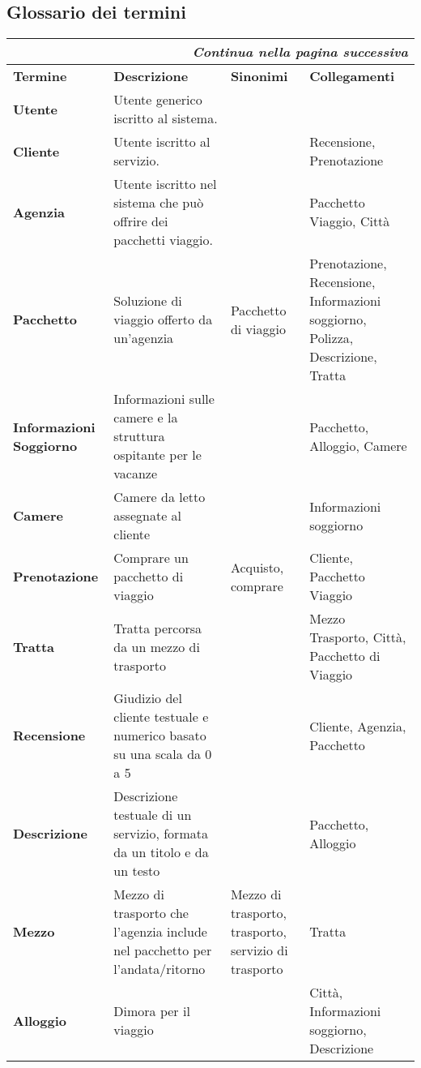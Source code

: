 \subsection{Glossario dei termini}
\begin{center}
    \begin{tabularx}{\textwidth}{p{} X >{\raggedright\arraybackslash}p{} >{\raggedright\arraybackslash}p{}}
        \caption{Dizionario termini}\\\toprule\endfirsthead
        \toprule\endhead
        \midrule\multicolumn{4}{r}{\itshape Continua nella pagina successiva}\\\midrule\endfoot
        \bottomrule\endlastfoot
        \textbf{Termine} & \textbf{Descrizione} & \textbf{Sinonimi} & \textbf{Collegamenti} \\
        \midrule
        \textbf{Utente} & Utente generico iscritto al sistema. & &
        \\\midrule
        \textbf{Cliente} & Utente iscritto al servizio. & & Recensione, Prenotazione
        \\\midrule
        \textbf{Agenzia} & Utente iscritto nel sistema che può offrire dei pacchetti viaggio. & & Pacchetto Viaggio, Città
        \\\midrule
        \textbf{Pacchetto} & Soluzione di viaggio offerto da un'agenzia & Pacchetto di viaggio & Prenotazione, Recensione, Informazioni soggiorno, Polizza, Descrizione, Tratta
        \\\midrule
        \textbf{Informazioni Soggiorno} & Informazioni sulle camere e la struttura ospitante per le vacanze & & Pacchetto, Alloggio, Camere
        \\\midrule
        \textbf{Camere} & Camere da letto assegnate al cliente & & Informazioni soggiorno
        \\\midrule
        \textbf{Prenotazione} & Comprare un pacchetto di viaggio & Acquisto, comprare & Cliente, Pacchetto Viaggio
        \\\midrule
        \textbf{Tratta} & Tratta percorsa da un mezzo di trasporto & & Mezzo Trasporto, Città, Pacchetto di Viaggio
        \\\midrule
        \textbf{Recensione} & Giudizio del cliente testuale e numerico basato su una scala da 0 a 5 & & Cliente, Agenzia, Pacchetto 
        \\\midrule
        \textbf{Descrizione} & Descrizione testuale di un servizio, formata da un titolo e da un testo & & Pacchetto, Alloggio
        \\\midrule
        \textbf{Mezzo} & Mezzo di trasporto che l'agenzia include nel pacchetto per l'andata/ritorno & Mezzo di trasporto, trasporto, servizio di trasporto & Tratta
        \\\midrule
        \textbf{Alloggio} & Dimora per il viaggio & & Città, Informazioni soggiorno, Descrizione
        \\
    \end{tabularx}
\end{center}

